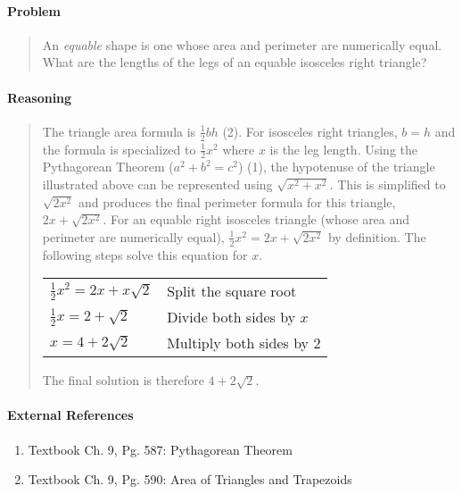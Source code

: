 \documentclass[letterpaper,12pt,twoside]{report}
\begin{document}
	\pagestyle{fancy}
	\fancyhf{}
	
	\paragraph{Problem}
	\begin{quote}
	\textsf{An \textit{equable} shape is one whose area and perimeter are numerically equal. What are the lengths of the legs of an equable isosceles right triangle?}
	\end{quote}
	
	\begin{center}
	\end{center}
	
	\paragraph{Reasoning}
	\begin{quotation}
	
	The triangle area formula is $\frac{1}{2}bh$ (2). For isosceles right triangles, $b=h$ and the formula is specialized to $\frac{1}{2}x^2$ where $x$ is the leg length. Using the Pythagorean Theorem ($a^2+b^2=c^2$) (1), the hypotenuse of the triangle illustrated above can be represented using $\sqrt{x^2+x^2}$. This is simplified to $\sqrt{2x^2}$ and produces the final perimeter formula for this triangle, $2x+\sqrt{2x^2}$. For an equable right isosceles triangle (whose area and perimeter are numerically equal), $\frac{1}{2}x^2 = 2x+\sqrt{2x^2}$ by definition. The following steps solve this equation for $x$.
	
	\begin{center}
		\begin{tabular}{l | l}
			$\frac{1}{2}x^2 = 2x+x\sqrt{2}$ & Split the square root \\
			$\frac{1}{2}x = 2+\sqrt{2}$ & Divide both sides by $x$ \\
			$x = 4+2\sqrt{2}$ & Multiply both sides by 2
		\end{tabular}
	\end{center}

	The final solution is therefore $\boxed{4+2\sqrt{2}}$.
	
	\end{quotation}
	
	\paragraph{External References}
	
	\begin{enumerate}
		\item Textbook Ch. 9, Pg. 587: Pythagorean Theorem
		\item Textbook Ch. 9, Pg. 590: Area of Triangles and Trapezoids
	\end{enumerate}
\end{document}
